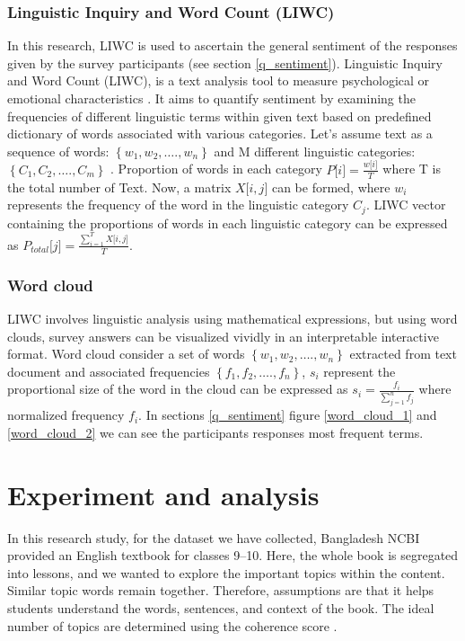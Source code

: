 \documentclass[sn-mathphys,Numbered]{sn-jnl}%
\theoremstyle{thmstyleone}%
\theoremstyle{thmstyletwo}%
\theoremstyle{thmstylethree}%
\begin{document}
\subsubsection{Linguistic Inquiry and Word Count (LIWC)} \label{liwc}
In this research, LIWC is used to ascertain the general sentiment of the responses given by the survey participants (see section \ref{q_sentiment}). Linguistic Inquiry and Word Count (LIWC), is a text analysis tool to measure psychological or emotional characteristics \cite{tausczik2010psychological, liwc22_welcome_nodate}. It aims to quantify sentiment by examining the frequencies of different linguistic terms within given text based on predefined dictionary of words associated with various categories. Let's assume text as a sequence of words: \(\left\{ w_{1},w_{2},\ldots.,w_{n} \right\}\) and M different linguistic categories: \(\left\{ C_{1},C_{2},\ldots.,C_{m} \right\}\) . Proportion of words in each category \(P\lbrack i\rbrack = \frac{w\lbrack i\rbrack}{T}\) where T is the total number of Text. Now, a matrix \(X\lbrack i,j\rbrack\) can be formed, where \(w_{i}\) represents the frequency of the word in the linguistic category \(C_{j}\). LIWC vector containing the proportions of words in each linguistic category can be expressed as \(P_{total}\lbrack j\rbrack = \frac{\sum_{i = 1}^{T}{X\lbrack i,j\rbrack}}{T}\).

\subsubsection{Word cloud} \label{wordcloud} LIWC involves linguistic analysis using mathematical expressions, but using word clouds, survey answers can be visualized vividly in an interpretable interactive format. Word cloud consider a set of words \(\left\{ w_{1},w_{2},\ldots.,w_{n} \right\}\) extracted from text document and associated frequencies \(\left\{ f_{1},f_{2},\ldots.,f_{n} \right\}\), \(s_{i}\) represent the proportional size of the word in the cloud can be expressed as \(s_{i} = \frac{f_{i}}{\sum_{j = 1}^{n}f_{j}}\) where normalized frequency \(f_{i}\). In sections \ref{q_sentiment} figure \ref{word_cloud_1} and \ref{word_cloud_2} we can see the participants responses most frequent terms.

\section{Experiment and analysis}\label{exp_analysis} In this research study, for the dataset we have collected, Bangladesh NCBI provided an English textbook for classes 9–10. Here, the whole book is segregated into lessons, and we wanted to explore the important topics within the content. Similar topic words remain together. Therefore, assumptions are that it helps students understand the words, sentences, and context of the book. The ideal number of topics are determined using the coherence score \cite{mimno2011optimizing}. 
\end{document}
